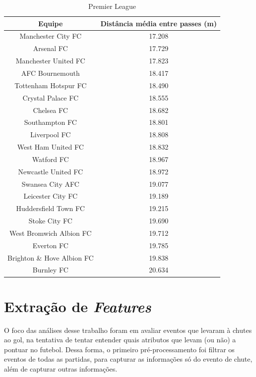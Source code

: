 \documentclass{article}
\begin{document}
\begin{table}[H]
	\centering
	\begin{tabular}{|c|c|}
		\hline
		\textbf{Equipe}            & \textbf{Distância média entre
			passes (m)}
		\\ \hline
		Manchester City FC         & 17.208
		\\ \hline
		Arsenal FC                 & 17.729
		\\ \hline
		Manchester United FC       & 17.823
		\\ \hline
		AFC Bournemouth            & 18.417
		\\ \hline
		Tottenham Hotspur FC       & 18.490
		\\ \hline
		Crystal Palace FC          & 18.555
		\\ \hline
		Chelsea FC                 & 18.682
		\\ \hline
		Southampton FC             & 18.801
		\\ \hline
		Liverpool FC               & 18.808
		\\ \hline
		West Ham United FC         & 18.832
		\\ \hline
		Watford FC                 & 18.967
		\\ \hline
		Newcastle United FC        & 18.972
		\\ \hline
		Swansea City AFC           & 19.077
		\\ \hline
		Leicester City FC          & 19.189
		\\ \hline
		Huddersfield Town FC       & 19.215
		\\ \hline
		Stoke City FC              & 19.690
		\\ \hline
		West Bromwich Albion FC    & 19.712
		\\ \hline
		Everton FC                 & 19.785
		\\ \hline
		Brighton \& Hove Albion FC & 19.838
		\\ \hline
		Burnley FC                 & 20.634
		\\ \hline
	\end{tabular}
	\caption{Premier League}
	\label{tab:average_distance_england}
\end{table}


\section{Extração de \textit{Features}}

O foco das análises desse trabalho foram em avaliar eventos que levaram à 
chutes ao gol, na tentativa de tentar entender quais atributos que levam 
(ou não) a pontuar no futebol. Dessa forma, o primeiro pré-processamento foi 
filtrar os eventos de todas as partidas, para capturar as informações só
do evento de chute, além de capturar outras informações.
\end{document}
